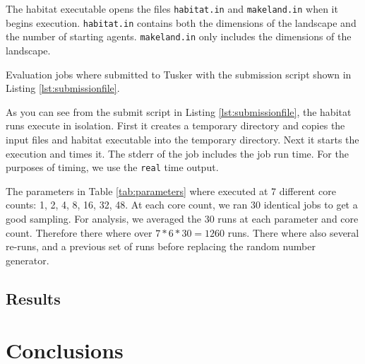 \documentclass[12pt, notitlepage]{article}
\begin{document}
The habitat executable opens the files \texttt{habitat.in} and \texttt{makeland.in} when it begins execution.  \texttt{habitat.in} contains both the dimensions of the landscape and the number of starting agents.  \texttt{makeland.in} only includes the dimensions of the landscape.

Evaluation jobs where submitted to Tusker with the submission script shown in Listing \ref{lst:submissionfile}.

\begin{figure}[ht]

\end{figure}

As you can see from the submit script in Listing \ref{lst:submissionfile}, the habitat runs execute in isolation.  First it creates a temporary directory and copies the input files and habitat executable into the temporary directory.  Next it starts the execution and times it.  The stderr of the job includes the job run time.  For the purposes of timing, we use the \texttt{real} time output.

The parameters in Table \ref{tab:parameters} where executed at 7 different core counts: 1, 2, 4, 8, 16, 32, 48.  At each core count, we ran 30 identical jobs to get a good sampling.  For analysis, we averaged the 30 runs at each parameter and core count.  Therefore there where over $7 * 6 * 30 = 1260$ runs.  There where also several re-runs, and a previous set of runs before replacing the random number generator.

\subsection{Results}

\section{Conclusions}
\end{document}

